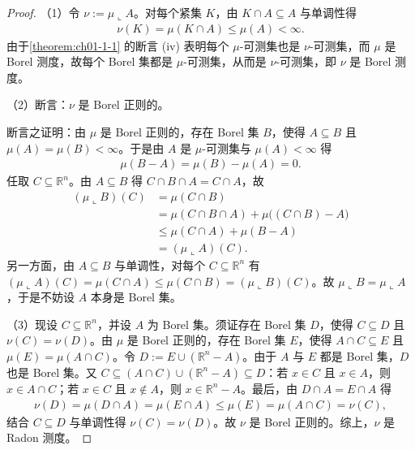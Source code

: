 \documentclass[../../main.tex]{subfiles}
\begin{document}
\begin{proof}
（1）令 $\nu:=\mu\llcorner A$。对每个紧集 $K$，由 $K\cap A\subseteq A$ 与单调性得
\begin{align*}
\nu(K)=\mu(K\cap A)\leqslant\mu(A)<\infty.
\end{align*}
由于\cref{theorem:ch01-1-1} 的断言 (iv) 表明每个 $\mu$-可测集也是 $\nu$-可测集，而 $\mu$ 是 Borel 测度，故每个 Borel 集都是 $\mu$-可测集，从而是 $\nu$-可测集，即 $\nu$ 是 Borel 测度。%

（2）断言：$\nu$ 是 Borel 正则的。

断言之证明：由 $\mu$ 是 Borel 正则的，存在 Borel 集 $B$，使得 $A\subseteq B$ 且 $\mu(A)=\mu(B)<\infty$。于是由 $A$ 是 $\mu$-可测集与 $\mu(A)<\infty$ 得
\begin{align*}
\mu(B-A)=\mu(B)-\mu(A)=0.
\end{align*}
任取 $C\subseteq\mathbb{R}^{n}$。由 $A\subseteq B$ 得 $C\cap B\cap A=C\cap A$，故
\begin{align*}
(\mu\llcorner B)(C)&=\mu(C\cap B)\\
&=\mu(C\cap B\cap A)+\mu\bigl((C\cap B)-A\bigr)\\
&\leqslant\mu(C\cap A)+\mu(B-A)\\
&=(\mu\llcorner A)(C).
\end{align*}
另一方面，由 $A\subseteq B$ 与单调性，对每个 $C\subseteq\mathbb{R}^{n}$ 有 $(\mu\llcorner A)(C)=\mu(C\cap A)\leqslant\mu(C\cap B)=(\mu\llcorner B)(C)$。故 $\mu\llcorner B=\mu\llcorner A$，于是不妨设 $A$ 本身是 Borel 集。

（3）现设 $C\subseteq\mathbb{R}^{n}$，并设 $A$ 为 Borel 集。须证存在 Borel 集 $D$，使得 $C\subseteq D$ 且 $\nu(C)=\nu(D)$。由 $\mu$ 是 Borel 正则的，存在 Borel 集 $E$，使得 $A\cap C\subseteq E$ 且 $\mu(E)=\mu(A\cap C)$。令 $D:=E\cup(\mathbb{R}^{n}-A)$。由于 $A$ 与 $E$ 都是 Borel 集，$D$ 也是 Borel 集。又 $C\subseteq(A\cap C)\cup(\mathbb{R}^{n}-A)\subseteq D$：若 $x\in C$ 且 $x\in A$，则 $x\in A\cap C$；若 $x\in C$ 且 $x\notin A$，则 $x\in\mathbb{R}^{n}-A$。最后，由 $D\cap A=E\cap A$ 得
\begin{align*}
\nu(D)=\mu(D\cap A)=\mu(E\cap A)\leqslant\mu(E)=\mu(A\cap C)=\nu(C),
\end{align*}
结合 $C\subseteq D$ 与单调性得 $\nu(C)=\nu(D)$。故 $\nu$ 是 Borel 正则的。综上，$\nu$ 是 Radon 测度。
\end{proof}
\end{document}
